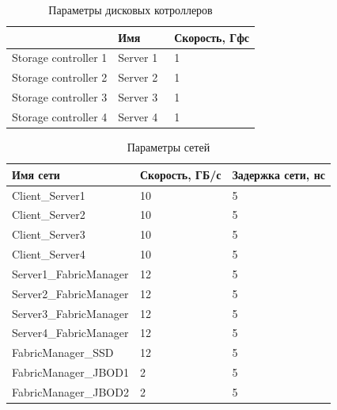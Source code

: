 \begin{table}[]
\centering
\caption{Параметры дисковых котроллеров}
\label{tab:storage-contollers}
\begin{tabularx}{\textwidth}{|l|l|l|} 
\hline
                     & Имя       & Скорость, Гфс  \\ 
\hline
Storage controller 1 & Server 1~ & 1              \\ 
\hline
Storage controller 2 & Server 2~ & 1              \\ 
\hline
Storage controller 3 & Server 3~ & 1              \\ 
\hline
Storage controller 4 & Server 4~ & 1              \\
\hline
\end{tabularx}
\end{table}


\begin{table}
\centering
\caption{Параметры сетей}
\label{tab:links}
\begin{tabularx}{\textwidth}{|l|l|l|} 
\hline
Имя сети               & Скорость, ГБ/с & Задержка сети, нс  \\ 
\hline
Client\_Server1        & 10             & 5                  \\ 
\hline
Client\_Server2        & 10             & 5                  \\ 
\hline
Client\_Server3        & 10             & 5                  \\ 
\hline
Client\_Server4        & 10             & 5                  \\ 
\hline
Server1\_FabricManager & 12             & 5                  \\ 
\hline
Server2\_FabricManager & 12             & 5                  \\ 
\hline
Server3\_FabricManager & 12             & 5                  \\ 
\hline
Server4\_FabricManager & 12             & 5                  \\ 
\hline
FabricManager\_SSD     & 12             & 5                  \\ 
\hline
FabricManager\_JBOD1   & 2              & 5                  \\ 
\hline
FabricManager\_JBOD2   & 2              & 5                  \\
\hline
\end{tabularx}
\end{table}


